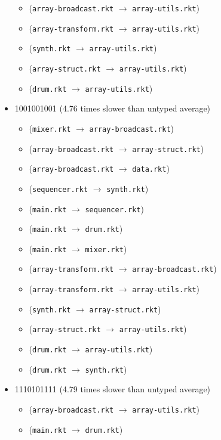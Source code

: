 \documentclass{article}
\newcommand{\mono}[1]{\texttt{#1}}
\begin{document}
\begin{itemize}
  \begin{itemize}
  \item (\mono{array-broadcast.rkt} $\rightarrow$ \mono{array-utils.rkt})
  \item (\mono{array-transform.rkt} $\rightarrow$ \mono{array-utils.rkt})
  \item (\mono{synth.rkt} $\rightarrow$ \mono{array-utils.rkt})
  \item (\mono{array-struct.rkt} $\rightarrow$ \mono{array-utils.rkt})
  \item (\mono{drum.rkt} $\rightarrow$ \mono{array-utils.rkt})
  \end{itemize}
\item 1001001001 (4.76 times slower than untyped average)
  \begin{itemize}
  \item (\mono{mixer.rkt} $\rightarrow$ \mono{array-broadcast.rkt})
  \item (\mono{array-broadcast.rkt} $\rightarrow$ \mono{array-struct.rkt})
  \item (\mono{array-broadcast.rkt} $\rightarrow$ \mono{data.rkt})
  \item (\mono{sequencer.rkt} $\rightarrow$ \mono{synth.rkt})
  \item (\mono{main.rkt} $\rightarrow$ \mono{sequencer.rkt})
  \item (\mono{main.rkt} $\rightarrow$ \mono{drum.rkt})
  \item (\mono{main.rkt} $\rightarrow$ \mono{mixer.rkt})
  \item (\mono{array-transform.rkt} $\rightarrow$ \mono{array-broadcast.rkt})
  \item (\mono{array-transform.rkt} $\rightarrow$ \mono{array-utils.rkt})
  \item (\mono{synth.rkt} $\rightarrow$ \mono{array-struct.rkt})
  \item (\mono{array-struct.rkt} $\rightarrow$ \mono{array-utils.rkt})
  \item (\mono{drum.rkt} $\rightarrow$ \mono{array-utils.rkt})
  \item (\mono{drum.rkt} $\rightarrow$ \mono{synth.rkt})
  \end{itemize}
\item 1110101111 (4.79 times slower than untyped average)
  \begin{itemize}
  \item (\mono{array-broadcast.rkt} $\rightarrow$ \mono{array-utils.rkt})
  \item (\mono{main.rkt} $\rightarrow$ \mono{drum.rkt})

\end{itemize}
\end{itemize}
\end{document}

